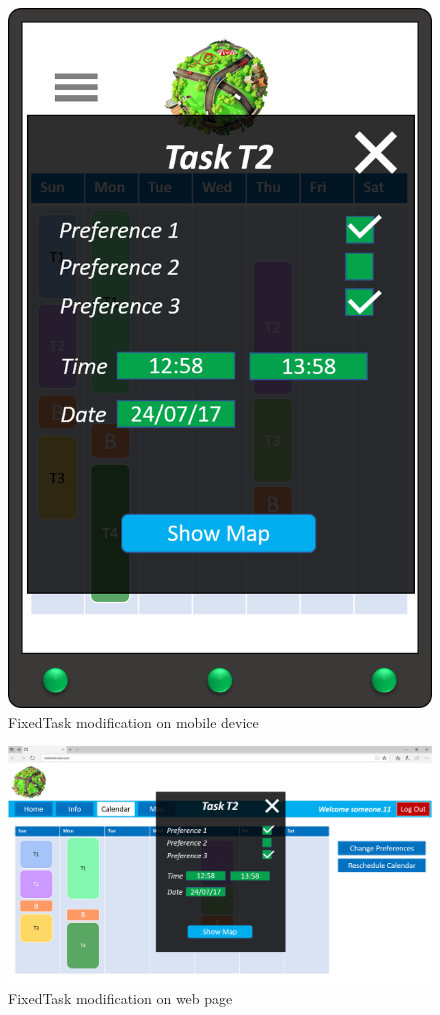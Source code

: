 \begin{figure}[H]
    \centering
    \includegraphics[scale=0.3]{Pictures/Mockups/AppTask.png}
    \caption{FixedTask modification on mobile device}
\end{figure}

\begin{figure}[H]
    \centering
    \includegraphics[scale=0.25]{Pictures/Mockups/SiteTask.png}
    \caption{FixedTask modification on web page}
\end{figure}

